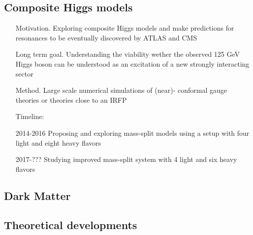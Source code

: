 \documentclass[prd,showpacs,showkeys,preprintnumbers,floatfix,
nofootinbib%
]{revtex4-2}
\begin{document}
\subsection{Composite Higgs models}
\begin{itemize}
    \item[Motivation.] Exploring composite Higgs models and make
     predictions for resonances to be eventually discovered by ATLAS
     and CMS
    \item[Long term goal.] Understanding the viability wether the
     observed 125 GeV Higgs boson can be understood as an excitation of
     a new strongly interacting sector
    \item[Method.] Large scale numerical simulations of (near)-
     conformal gauge theories or theories close to an IRFP
    \item[Timeline:]
    \item[2014-2016] Proposing and exploring mass-split models using a
     setup with four light and eight heavy flavors
    \item[2017-???] Studying improved mass-split system with 4 light
     and six heavy flavors
\end{itemize}

\subsection{Dark Matter}

\subsection{Theoretical developments}

\newpage

\appendix

%


\end{document}
